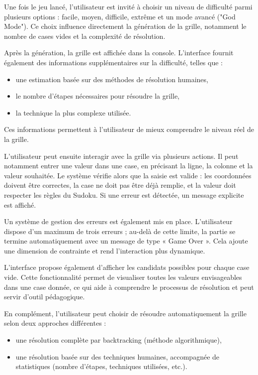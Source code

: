 \documentclass[a4paper]{article}
\begin{document}
Une fois le jeu lancé, l’utilisateur est invité à choisir un niveau de difficulté parmi plusieurs options : facile, moyen, difficile, extrême et un mode avancé ("God Mode"). Ce choix influence directement la génération de la grille, notamment le nombre de cases vides et la complexité de résolution.

Après la génération, la grille est affichée dans la console. L’interface fournit également des informations supplémentaires sur la difficulté, telles que :
\begin{itemize}
    \item une estimation basée sur des méthodes de résolution humaines,
    \item le nombre d’étapes nécessaires pour résoudre la grille,
    \item la technique la plus complexe utilisée.
\end{itemize}

Ces informations permettent à l’utilisateur de mieux comprendre le niveau réel de la grille.

L’utilisateur peut ensuite interagir avec la grille via plusieurs actions. Il peut notamment entrer une valeur dans une case, en précisant la ligne, la colonne et la valeur souhaitée. Le système vérifie alors que la saisie est valide : les coordonnées doivent être correctes, la case ne doit pas être déjà remplie, et la valeur doit respecter les règles du Sudoku. Si une erreur est détectée, un message explicite est affiché.

Un système de gestion des erreurs est également mis en place. L’utilisateur dispose d’un maximum de trois erreurs ; au-delà de cette limite, la partie se termine automatiquement avec un message de type « Game Over ». Cela ajoute une dimension de contrainte et rend l’interaction plus dynamique.

L’interface propose également d’afficher les candidats possibles pour chaque case vide. Cette fonctionnalité permet de visualiser toutes les valeurs envisageables dans une case donnée, ce qui aide à comprendre le processus de résolution et peut servir d’outil pédagogique.

En complément, l’utilisateur peut choisir de résoudre automatiquement la grille selon deux approches différentes :
\begin{itemize}
    \item une résolution complète par backtracking (méthode algorithmique),
    \item une résolution basée sur des techniques humaines, accompagnée de statistiques (nombre d’étapes, techniques utilisées, etc.).
\end{itemize}
\end{document}
